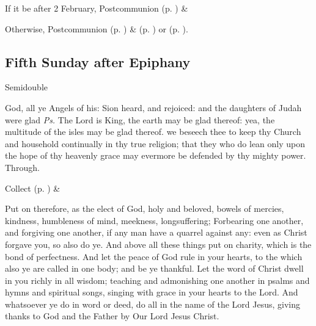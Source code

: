 
\begin{rubric}
    If it be after 2 February,  Postcommunion  (p. \pageref{SPSaints}) \&  
\end{rubric}
\begin{rubric}
	Otherwise,  Postcommunion  (p. \pageref{SPMaryPostChristmas}) \&   (p. \pageref{SPAgainst}) or  (p. \pageref{SPChiefBishop}).
\end{rubric}


\subsection{Fifth Sunday after Epiphany}\label{EpiphanyV}
\begin{inhead}
{Semidouble}
\end{inhead}


\introit
{} God, all ye Angels of his: Sion heard, and rejoiced: and the daughters of Judah were glad \textit{Ps.} The Lord is King, the earth may be glad thereof: yea, the multitude of the isles may be glad thereof.
\collect\label{EpiphanyVCollect}
 we beseech thee to keep thy Church and household continually in thy true religion; that they who do lean only upon the hope of thy heavenly grace may evermore be defended by thy mighty power. Through.
\begin{rubric}
     Collect  (p. \pageref{SPSaints}) \&  
\end{rubric}
 Put on therefore, as the elect of God, holy and beloved, bowels of mercies, kindness, humbleness of mind, meekness, longsuffering; Forbearing one another, and forgiving one another, if any man have a quarrel against any: even as Christ forgave you, so also do ye. And above all these things put on charity, which is the bond of perfectness. And let the peace of God rule in your hearts, to the which also ye are called in one body; and be ye thankful. Let the word of Christ dwell in you richly in all wisdom; teaching and admonishing one another in psalms and hymns and spiritual songs, singing with grace in your hearts to the Lord. And whatsoever ye do in word or deed, do all in the name of the Lord Jesus, giving thanks to God and the Father by Our Lord Jesus Christ.

